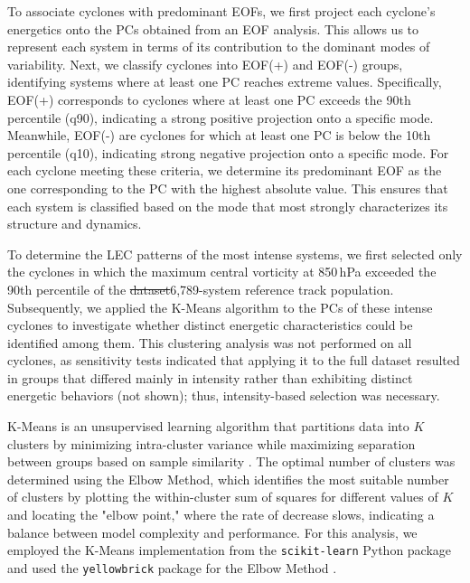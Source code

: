 \documentclass[pdflatex,sn-chicago]{sn-jnl}%
\makeatletter
\theoremstyle{plain}
\theoremstyle{definition}
\theoremstyle{remark}
\theoremstyle{definition}
\providecommand{\DIFaddtex}[1]{{\protect\color{blue}#1}} %
\providecommand{\DIFdeltex}[1]{{\protect\color{red}\sout{#1}}} %
\providecommand{\DIFaddbegin}{} %
\providecommand{\DIFaddend}{} %
\providecommand{\DIFdelbegin}{} %
\providecommand{\DIFdelend}{} %
\providecommand{\DIFadd}[1]{\texorpdfstring{\DIFaddtex{#1}}{#1}} %
\providecommand{\DIFdel}[1]{\texorpdfstring{\DIFdeltex{#1}}{}} %
\let\sout@orig\sout %
\renewcommand{\sout}[1]{\ifmmode\text{\sout@orig{\ensuremath{#1}}}\else\sout@orig{#1}\fi} %
\makeatother
\begin{document}
To associate cyclones with predominant EOFs, we first project each cyclone's energetics onto the PCs obtained from an EOF analysis. This allows us to represent each system in terms of its contribution to the dominant modes of variability. Next, we classify cyclones into EOF(+) and EOF(-) groups, identifying systems where at least one PC reaches extreme values. Specifically, EOF(+) corresponds to cyclones where at least one PC exceeds the 90th percentile (q90), indicating a strong positive projection onto a specific mode. Meanwhile, EOF(-) are  cyclones for which at least one PC is below the 10th percentile (q10), indicating strong negative projection onto a specific mode. For each cyclone meeting these criteria, we determine its predominant EOF as the one corresponding to the PC with the highest absolute value. This ensures that each system is classified based on the mode that most strongly characterizes its structure and dynamics.

To determine the LEC patterns of the most intense systems, we first selected only the cyclones in which the maximum central vorticity at 850\,hPa exceeded the 90th percentile of the \DIFdelbegin \DIFdel{dataset}\DIFdelend \DIFaddbegin \DIFadd{6,789-system reference track population}\DIFaddend . Subsequently, we applied the K-Means algorithm to the PCs of these intense cyclones to investigate whether distinct energetic characteristics could be identified among them. This clustering analysis was not performed on all cyclones, as sensitivity tests indicated that applying it to the full dataset resulted in groups that differed mainly in intensity rather than exhibiting distinct energetic behaviors (not shown); thus, intensity-based selection was necessary.

K-Means is an unsupervised learning algorithm that partitions data into \( K \) clusters by minimizing intra-cluster variance while maximizing separation between groups based on sample similarity \citep{macqueen1967,hartiganwong1979}. The optimal number of clusters was determined using the Elbow Method, which identifies the most suitable number of clusters by plotting the within-cluster sum of squares for different values of \( K \) and locating the "elbow point," where the rate of decrease slows, indicating a balance between model complexity and performance. For this analysis, we employed the K-Means implementation from the \texttt{scikit-learn} Python package \citep{hao2019machine} and used the \texttt{yellowbrick} package for the Elbow Method \citep{bengfort2019yellowbrick}.
\end{document}
